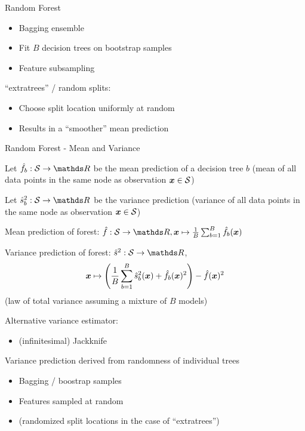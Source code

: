 \documentclass[11pt,compress,t,notes=noshow, xcolor=table]{beamer}
\begin{document}
\begin{framev}{Random Forest}
\begin{itemize}
\item Bagging ensemble
\item Fit $B$ decision trees on bootstrap samples
\item Feature subsampling
\end{itemize}
\vfill
{}
\spacer
\enquote{extratrees} / random splits:
\begin{itemize}
\item Choose split location uniformly at random
\item Results in a \enquote{smoother} mean prediction
\end{itemize}
\end{framev}


\begin{framei}[fs=small]{Random Forest - Mean and Variance}
\item Let $\fh_b: \mathcal{S} \to \R$ be the mean prediction of a decision tree $b$ (mean of all data points in the same node as observation $\bm{x} \in \mathcal{S}$)
\item Let $\sh_{b}^2: \mathcal{S} \to \R$ be the variance prediction (variance of all data points in the same node as observation $\bm{x} \in \mathcal{S}$)
\item Mean prediction of forest: $\fh: \mathcal{S} \to \R, \xv \mapsto \frac{1}{B} \sum_{b = 1}^{B} \fh_{b}(\xv) $
\item Variance prediction of forest: $\sh^{2}: \mathcal{S} \to \R$,
$$
\bm{x} \mapsto  \left( \frac{1}{B} \sum_{b = 1}^{B} \hat{s}_{b}^2(\bm{x}) + \hat{f}_{b}(\bm{x})^{2} \right) - \hat{f}(\bm{x})^{2}
$$
(law of total variance assuming a mixture of $B$ models)
\item Alternative variance estimator:
\begin{itemize}
\item (infinitesimal) Jackknife
\end{itemize}
\item Variance prediction derived from randomness of individual trees
\begin{itemize}
\item Bagging / boostrap samples
\item Features sampled at random
\item (randomized split locations in the case of \enquote{extratrees})
\end{itemize}
\end{framei}
\end{document}
